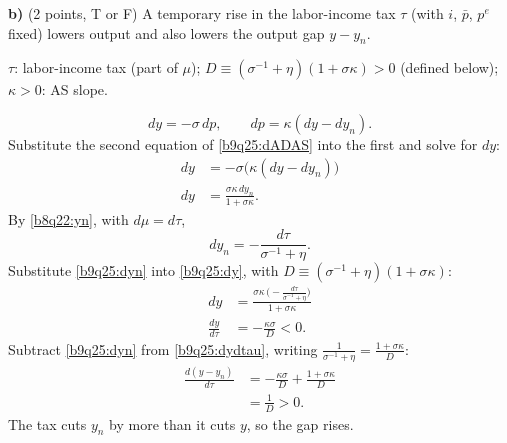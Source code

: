 \medskip
\textbf{b)} (2 points, T or F) A temporary rise in the labor-income tax $\tau$ (with $i$, $\bar p$, $p^e$ fixed) lowers output and also lowers
the output gap $y-y_n$.
\begin{sol}
\begin{notacao}
\item $\tau$: labor-income tax (part of $\mu$); $D\equiv(\sigma^{-1}+\eta)(1+\sigma\kappa)>0$ (defined below); $\kappa>0$: AS slope.
\end{notacao}
\begin{equation}
dy=-\sigma\,dp,\qquad dp=\kappa(dy-dy_n). \label{b9q25:dADAS}
\end{equation}
Substitute the second equation of \eqref{b9q25:dADAS} into the first and solve for $dy$:
\begin{align}
dy&=-\sigma\big(\kappa(dy-dy_n)\big)\nonumber\\
dy&=\frac{\sigma\kappa\,dy_n}{1+\sigma\kappa}. \label{b9q25:dy}
\end{align}
By \eqref{b8q22:yn}, with $d\mu=d\tau$,
\begin{equation}
dy_n=-\frac{d\tau}{\sigma^{-1}+\eta}. \label{b9q25:dyn}
\end{equation}
Substitute \eqref{b9q25:dyn} into \eqref{b9q25:dy}, with $D\equiv(\sigma^{-1}+\eta)(1+\sigma\kappa)$:
\begin{align}
dy&=\frac{\sigma\kappa\,\big(-\frac{d\tau}{\sigma^{-1}+\eta}\big)}{1+\sigma\kappa}\nonumber\\
\frac{dy}{d\tau}&=-\frac{\kappa\sigma}{D}<0. \label{b9q25:dydtau}
\end{align}
Subtract \eqref{b9q25:dyn} from \eqref{b9q25:dydtau}, writing $\frac1{\sigma^{-1}+\eta}=\frac{1+\sigma\kappa}{D}$:
\begin{align*}
\frac{d(y-y_n)}{d\tau}&=-\frac{\kappa\sigma}{D}+\frac{1+\sigma\kappa}{D}\\
&=\frac1D>0 .
\end{align*}
The tax cuts $y_n$ by more than it cuts $y$, so the gap rises.
\end{sol}

